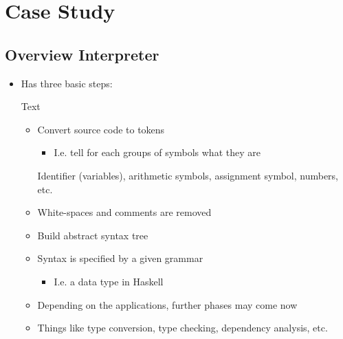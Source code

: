 
\section{Case Study}
\subsection{Overview Interpreter}
\begin{itemize}
    \item Has three basic steps:
        \begin{itemize}
             Text
                \begin{itemize}
                        \begin{itemize}
                            \item Convert source code to tokens
                                \begin{itemize}
                                    \item I.e. tell for each groups of symbols what they are
                                \end{itemize}
                             Identifier (variables), arithmetic symbols, assignment symbol, numbers, etc.
                            \item White-spaces and comments are removed
                        \end{itemize}
                        \begin{itemize}
                            \item Build abstract syntax tree
                            \item Syntax is specified by a given grammar
                                \begin{itemize}
                                    \item I.e. a data type in Haskell
                                \end{itemize}
                        \end{itemize}
                        \begin{itemize}
                            \item Depending on the applications, further phases may come now
                            \item Things like type conversion, type checking, dependency analysis, etc.

\end{itemize}
\end{itemize}
\end{itemize}
\end{itemize}
